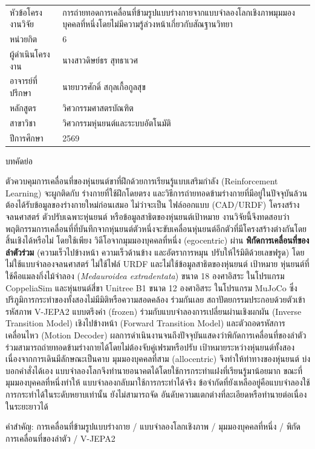 \documentclass[11pt,a4paper]{article}
\begin{document}
\noindent
\begin{tabular}{@{}p{4.8cm}p{9.7cm}@{}}
หัวข้อโครงงานวิจัย & การถ่ายทอดการเคลื่อนที่ข้ามรูปแบบร่างกายจากแบบจำลองโลกเชิงภาพมุมมองบุคคลที่หนึ่งโดยไม่มีความรู้ล่วงหน้าเกี่ยวกับสัณฐานวิทยา\\[2mm]
หน่วยกิต           & 6\\[2mm]
ผู้ดำเนินโครงงาน   & นางสาวดิษย์ธร สุทธาเวศ\\[2mm]
อาจารย์ที่ปรึกษา   & นายบวรศักดิ์ สกุลเกื้อกูลสุข\\[2mm]
หลักสูตร           & วิศวกรรมศาสตรบัณฑิต\\[2mm]
สาขาวิชา           & วิศวกรรมหุ่นยนต์และระบบอัตโนมัติ\\[2mm]
ปีการศึกษา         & 2569\\
\end{tabular}

\vspace{3mm}
\begin{center}บทคัดย่อ\end{center}
\vspace{1mm}

\noindent ตัวควบคุมการเคลื่อนที่ของหุ่นยนต์ขาที่ฝึกด้วยการเรียนรู้แบบเสริมกำลัง (Reinforcement Learning) จะผูกติดกับ
ร่างกายที่ใช้ฝึกโดยตรง และวิธีการถ่ายทอดข้ามร่างกายที่มีอยู่ในปัจจุบันล้วนต้องได้รับข้อมูลของร่างกายใหม่ก่อนเสมอ ไม่ว่าจะเป็น
ไฟล์ออกแบบ (CAD/URDF) โครงสร้างจลนศาสตร์ ตัวปรับเฉพาะหุ่นยนต์ หรือข้อมูลสาธิตของหุ่นยนต์เป้าหมาย งานวิจัยนี้จึงทดสอบว่า
พฤติกรรมการเคลื่อนที่ที่บันทึกจากหุ่นยนต์ตัวหนึ่งจะขับเคลื่อนหุ่นยนต์อีกตัวที่มีโครงสร้างต่างกันโดยสิ้นเชิงได้หรือไม่ โดยใช้เพียง
วิดีโอจากมุมมองบุคคลที่หนึ่ง (egocentric) ผ่าน \textbf{พิกัดการเคลื่อนที่ของลำตัวร่วม} (ความเร็วไปข้างหน้า ความเร็วด้านข้าง
และอัตราการหมุน ปรับให้ไร้มิติด้วยเลขฟรูด) โดยไม่ใช้แบบจำลองจลนศาสตร์ ไม่ใช้ไฟล์ URDF และไม่ใช้ข้อมูลสาธิตของหุ่นยนต์
เป้าหมาย หุ่นยนต์ที่ใช้คือแมลงกิ่งไม้จำลอง (\emph{Medauroidea extradentata}) ขนาด 18 องศาอิสระ ในโปรแกรม CoppeliaSim
และหุ่นยนต์สี่ขา Unitree B1 ขนาด 12 องศาอิสระ ในโปรแกรม MuJoCo ซึ่งปริภูมิการกระทำของทั้งสองไม่มีมิติหรือความสอดคล้อง
ร่วมกันเลย สถาปัตยกรรมประกอบด้วยตัวเข้ารหัสภาพ V-JEPA2 แบบตรึงค่า (frozen) ร่วมกับแบบจำลองการเปลี่ยนผ่านเชิงผกผัน
(Inverse Transition Model) เชิงไปข้างหน้า (Forward Transition Model) และตัวถอดรหัสการเคลื่อนไหว (Motion Decoder)
ผลการดำเนินงานจนถึงปัจจุบันแสดงว่าพิกัดการเคลื่อนที่ของลำตัวร่วมสามารถถ่ายทอดข้ามร่างกายได้โดยไม่ต้องจับคู่เฟรมหรือปรับ
เป้าหมายระหว่างหุ่นยนต์ทั้งสอง เนื่องจากการเดินมีลักษณะเป็นคาบ มุมมองบุคคลที่สาม (allocentric) จึงทำให้ท่าทางของหุ่นยนต์
บ่งบอกคำสั่งได้เอง แบบจำลองโลกจึงทำนายอนาคตได้โดยใช้การกระทำแฝงที่เรียนรู้มาน้อยมาก ขณะที่มุมมองบุคคลที่หนึ่งทำให้
แบบจำลองกลับมาใช้การกระทำได้จริง ข้อจำกัดที่ยังเหลืออยู่คือแบบจำลองใช้การกระทำได้ในระดับหยาบเท่านั้น ยังไม่สามารถจัด
อันดับความแตกต่างที่ละเอียดหรือทำนายต่อเนื่องในระยะยาวได้

\vspace{2mm}
\noindent คำสำคัญ: การเคลื่อนที่ข้ามรูปแบบร่างกาย / แบบจำลองโลกเชิงภาพ / มุมมองบุคคลที่หนึ่ง / พิกัดการเคลื่อนที่ของลำตัว / V-JEPA2
\end{document}
